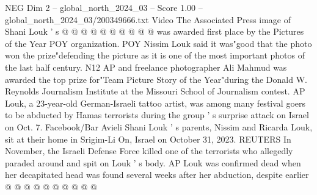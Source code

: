 \begin{textsample}{NEG Dim 2 – global\_north\_2024\_03 – Score 1.00 – global\_north\_2024\_03/200349666.txt}
Video The Associated Press image of Shani Louk ' s @ @ @ @ @ @ @ @ @ @ was awarded first place by the Pictures of the Year POY organization.
POY Nissim Louk said it was"good that the photo won the prize"defending the picture as it is one of the most important photos of the last half century.
N12 AP and freelance photographer Ali Mahmud was awarded the top prize for"Team Picture Story of the Year"during the Donald W.
Reynolds Journalism Institute at the Missouri School of Journalism contest.
AP Louk, a 23-year-old German-Israeli tattoo artist, was among many festival goers to be abducted by Hamas terrorists during the group ' s surprise attack on Israel on Oct. 7.
Facebook/Bar Avieli Shani Louk ' s parents, Nissim and Ricarda Louk, sit at their home in Srigim-Li On, Israel on October 31, 2023.
REUTERS In November, the Israeli Defense Force killed one of the terrorists who allegedly paraded around and spit on Louk ' s body.
AP Louk was confirmed dead when her decapitated head was found several weeks after her abduction, despite earlier @ @ @ @ @ @ @ @ @ @

\end{textsample}

